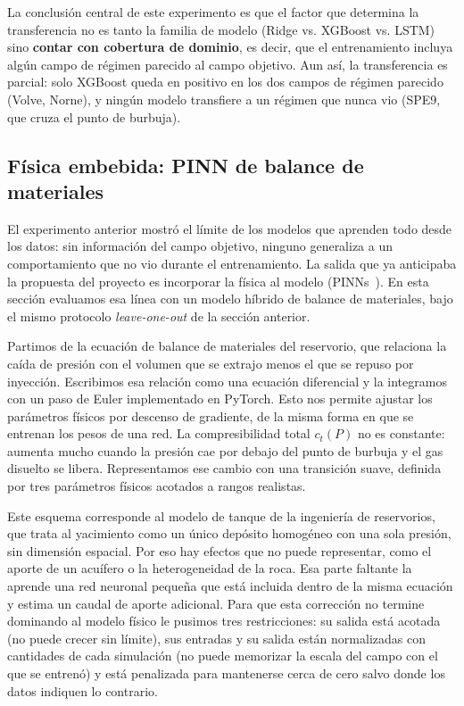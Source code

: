 \documentclass[12pt,a4paper]{article}
\begin{document}
La conclusión central de este experimento es que el factor que determina la transferencia no
es tanto la familia de modelo (Ridge vs. XGBoost vs. LSTM) sino \textbf{contar con cobertura de dominio},
es decir, que el entrenamiento incluya algún campo de régimen parecido al campo objetivo. Aun
así, la transferencia es parcial: solo XGBoost queda en positivo en los dos campos de
régimen parecido (Volve, Norne), y ningún modelo transfiere a un régimen que nunca vio
(SPE9, que cruza el punto de burbuja).

\subsection{Física embebida: PINN de balance de materiales}
\label{sec:pinn}

El experimento anterior mostró el límite de los modelos que aprenden todo desde los
datos: sin información del campo objetivo, ninguno generaliza a un comportamiento que no
vio durante el entrenamiento. La salida que ya anticipaba la propuesta del proyecto es
incorporar la física al modelo (PINNs~\cite{ref6}). En esta sección evaluamos esa línea
con un modelo híbrido de balance de materiales, bajo el mismo protocolo
\textit{leave-one-out} de la sección anterior.

Partimos de la ecuación de balance de materiales del reservorio, que relaciona la caída
de presión con el volumen que se extrajo menos el que se repuso por inyección. Escribimos
esa relación como una ecuación diferencial y la integramos con un paso de Euler
implementado en PyTorch. Esto nos permite ajustar los parámetros físicos por descenso de
gradiente, de la misma forma en que se entrenan los pesos de una red. La compresibilidad
total $c_t(P)$ no es constante: aumenta mucho cuando la presión cae por debajo del punto
de burbuja y el gas disuelto se libera. Representamos ese cambio con una transición
suave, definida por tres parámetros físicos acotados a rangos realistas.

Este esquema corresponde al modelo de tanque de la ingeniería de reservorios, que trata
al yacimiento como un único depósito homogéneo con una sola presión, sin dimensión
espacial. Por eso hay efectos que no puede representar, como el aporte de un acuífero o
la heterogeneidad de la roca. Esa parte faltante la aprende una red neuronal pequeña que
está incluida dentro de la misma ecuación y estima un caudal de aporte adicional. Para
que esta corrección no termine dominando al modelo físico le pusimos tres restricciones:
su salida está acotada (no puede crecer sin límite), sus entradas y su salida están
normalizadas con cantidades de cada simulación (no puede memorizar la escala del campo
con el que se entrenó) y está penalizada para mantenerse cerca de cero salvo donde los
datos indiquen lo contrario.
\end{document}
